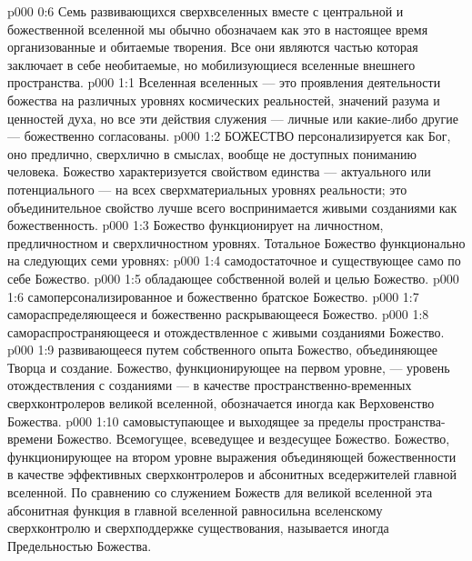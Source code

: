 \vs p000 0:6 Семь развивающихся сверхвселенных вместе с центральной и божественной вселенной мы обычно обозначаем как  это в настоящее время организованные и обитаемые творения. Все они являются частью  которая заключает в себе необитаемые, но мобилизующиеся вселенные внешнего пространства.
\vs p000 1:1 Вселенная вселенных --- это проявления деятельности божества на различных уровнях космических реальностей, значений разума и ценностей духа, но все эти действия служения --- личные или какие\hyp{}либо другие --- божественно согласованы.
\vs p000 1:2 \pc БОЖЕСТВО персонализируется как Бог, оно предлично, сверхлично в смыслах, вообще не доступных пониманию человека. Божество характеризуется свойством единства --- актуального или потенциального --- на всех сверхматериальных уровнях реальности; это объединительное свойство лучше всего воспринимается живыми созданиями как божественность.
\vs p000 1:3 \pc Божество функционирует на личностном, предличностном и сверхличностном уровнях. Тотальное Божество функционально на следующих семи уровнях:
\vs p000 1:4 \bibnobreakspace {} самодостаточное и существующее само по себе Божество.
\vs p000 1:5 \bibnobreakspace {} обладающее собственной волей и целью Божество.
\vs p000 1:6 \bibnobreakspace {} самоперсонализированное и божественно братское Божество.
\vs p000 1:7 \bibnobreakspace {} самораспределяющееся и божественно раскрывающееся Божество.
\vs p000 1:8 \bibnobreakspace {} самораспространяющееся и отождествленное с живыми созданиями Божество.
\vs p000 1:9 \bibnobreakspace {} развивающееся путем собственного опыта Божество, объединяющее Творца и создание. Божество, функционирующее на первом уровне, --- уровень отождествления с созданиями --- в качестве пространственно\hyp{}временных сверхконтролеров великой вселенной, обозначается иногда как Верховенство Божества.
\vs p000 1:10 \bibnobreakspace {} самовыступающее и выходящее за пределы пространства\hyp{}времени Божество. Всемогущее, всеведущее и вездесущее Божество. Божество, функционирующее на втором уровне выражения объединяющей божественности в качестве эффективных сверхконтролеров и абсонитных вседержителей главной вселенной. По сравнению со служением Божеств для великой вселенной эта абсонитная функция в главной вселенной равносильна вселенскому сверхконтролю и сверхподдержке существования, называется иногда Предельностью Божества.
